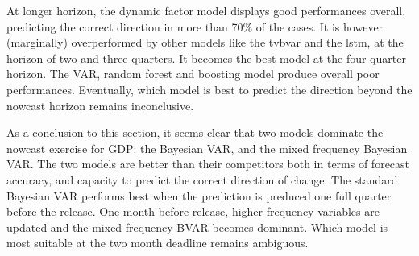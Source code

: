 At longer horizon, the dynamic factor model displays good performances overall, predicting the correct direction in more than 70\% of the cases. It is however (marginally) overperformed by other models like the tvbvar and the lstm, at the horizon of two and three quarters. It becomes the best model at the four quarter horizon. The VAR, random forest and boosting model produce overall poor performances. Eventually, which model is best to predict the direction beyond the nowcast horizon remains inconclusive.

As a conclusion to this section, it seems clear that two models dominate the nowcast exercise for GDP: the Bayesian VAR, and the mixed frequency Bayesian VAR. The two models are better than their competitors both in terms of forecast accuracy, and capacity to predict the correct direction of change. The standard Bayesian VAR performs best when the prediction is preduced one full quarter before the release. One month before release, higher frequency variables are updated and the mixed frequency BVAR becomes dominant. Which model is most suitable at the two month deadline remains ambiguous.




